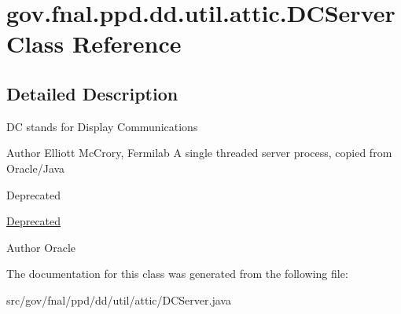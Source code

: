 \hypertarget{classgov_1_1fnal_1_1ppd_1_1dd_1_1util_1_1attic_1_1DCServer}{\section{gov.\-fnal.\-ppd.\-dd.\-util.\-attic.\-D\-C\-Server Class Reference}
\label{classgov_1_1fnal_1_1ppd_1_1dd_1_1util_1_1attic_1_1DCServer}
}


\subsection{Detailed Description}
D\-C stands for Display Communications

\begin{DoxyAuthor}{Author}
Elliott Mc\-Crory, Fermilab A single threaded server process, copied from Oracle/\-Java
\end{DoxyAuthor}
\begin{DoxyRefDesc}{Deprecated}
\item[\hyperlink{deprecated__deprecated000007}{Deprecated}]\end{DoxyRefDesc}


\begin{DoxyAuthor}{Author}
Oracle 
\end{DoxyAuthor}


The documentation for this class was generated from the following file\-:\begin{DoxyCompactItemize}
\item 
src/gov/fnal/ppd/dd/util/attic/D\-C\-Server.\-java\end{DoxyCompactItemize}

